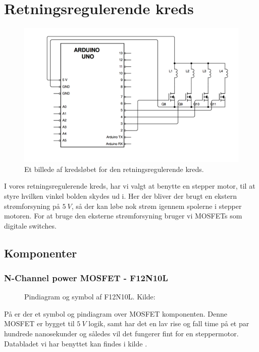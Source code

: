 \section{Retningsregulerende kreds}
\begin{figure}[H]	
	\centering
    \includegraphics[width=13cm]{figures/CIRCUITS/steppermotorFinal.png}
	\caption{Et billede af kredsløbet for den retningsregulerende kreds.}
	\label{kreds:retning}
\end{figure}
I vores retningsregulerende kreds, har vi valgt at benytte en stepper motor, til at styre hvilken vinkel bolden skydes ud i. Her der bliver der brugt en ekstern strømforsyning på $\SI{5}{V}$, så der kan løbe nok strøm igennem spolerne i stepper motoren. For at bruge den eksterne strømforsyning bruger vi MOSFETs som digitale switches.
\subsection{Komponenter}
\subsubsection{N-Channel power MOSFET - F12N10L}
\begin{figure}[H]
	\centering
	\caption{Pindiagram og symbol af F12N10L. Kilde:\cite{kompMOSFET}}
	\label{fig:kompMOSFET}
\end{figure}
På  er der et symbol og pindiagram over MOSFET komponenten.
Denne MOSFET er bygget til $\SI{5}{V}$ logik, samt har det en lav rise og fall time på et par hundrede nanosekunder og således vil det fungerer fint for en steppermotor. Databladet vi har benyttet kan findes i kilde \cite{kompMOSFET}. 

